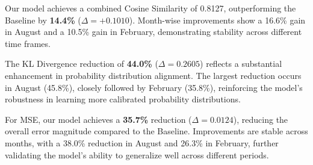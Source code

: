 \begin{table}[ht]
    \centering
    \caption{Performance comparison between Baseline and Our Model for multimodal experiments. The Baseline predictions are obtained by averaging the outputs from the two unimodal Baseline models. Higher values are better for $\uparrow$, and lower values are better for $\downarrow$. Bold values indicate combined scores.}
    \label{tab:comparison_multi}
\end{table}

Our model achieves a combined Cosine Similarity of 0.8127, outperforming the Baseline by \textbf{14.4\%} ($\Delta = +0.1010$). Month-wise improvements show a 16.6\% gain in August and a 10.5\% gain in February, demonstrating stability across different time frames. 
\newline

The KL Divergence reduction of \textbf{44.0\%} ($\Delta = 0.2605$) reflects a substantial enhancement in probability distribution alignment. The largest reduction occurs in August (45.8\%), closely followed by February (35.8\%), reinforcing the model's robustness in learning more calibrated probability distributions.
\newline

For MSE, our model achieves a \textbf{35.7\%} reduction ($\Delta = 0.0124$), reducing the overall error magnitude compared to the Baseline. Improvements are stable across months, with a 38.0\% reduction in August and 26.3\% in February, further validating the model’s ability to generalize well across different periods.



